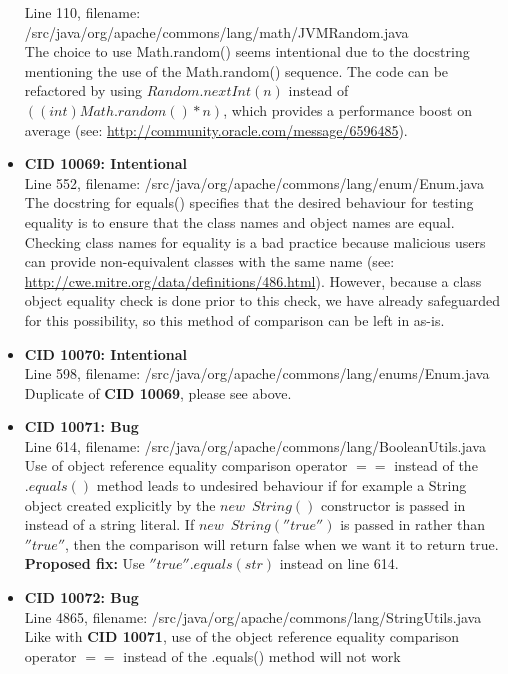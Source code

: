 \documentclass{article}
\begin{document}
\begin{itemize}
    Line 110, filename: /src/java/org/apache/commons/lang/math/JVMRandom.java \\
    The choice to use Math.random() seems intentional due to the docstring mentioning the use of the Math.random() sequence.
    The code can be refactored by using $Random.nextInt(n)$ instead of $((int)Math.random() * n)$, which provides a performance
    boost on average (see: \url{http://community.oracle.com/message/6596485}).
\item \textbf{CID 10069: Intentional} \\
    Line 552, filename: /src/java/org/apache/commons/lang/enum/Enum.java \\
    The docstring for equals() specifies that the desired behaviour for testing equality is to ensure that the class names and 
    object names are equal. Checking class names for equality is a bad practice because malicious users can provide non-equivalent
    classes with the same name (see: \url{http://cwe.mitre.org/data/definitions/486.html}). However, because a class object equality 
    check is done prior to this check, we have already safeguarded for this possibility, so this method of comparison can be left in as-is.
\item \textbf{CID 10070: Intentional} \\
    Line 598, filename: /src/java/org/apache/commons/lang/enums/Enum.java \\
    Duplicate of \textbf{CID 10069}, please see above.
\item \textbf{CID 10071: Bug} \\
    Line 614, filename: /src/java/org/apache/commons/lang/BooleanUtils.java \\
    Use of object reference equality comparison operator $==$ instead of the $.equals()$ method leads to undesired behaviour if for example
    a String object created explicitly by the $new \enspace String()$ constructor is passed in instead of a string literal. If $new \enspace String(''true'')$
    is passed in rather than $''true''$, then the comparison will return false when we want it to return true. \\
    \textbf{Proposed fix:} Use $''true''.equals(str)$ instead on line 614.
\item \textbf{CID 10072: Bug} \\
    Line 4865, filename: /src/java/org/apache/commons/lang/StringUtils.java \\
    Like with \textbf{CID 10071}, use of the object reference equality comparison operator $==$ instead of the .equals() method will not work 

\end{itemize}
\end{document}
